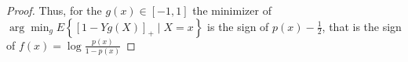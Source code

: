 \begin{proof}
	Thus, for the $g(x)\in\left[-1,1\right]$ the minimizer of $\arg\min_{g} E\left\{\left[1-Yg(X)\right]_{+}\mid X=x\right\}$ is the sign of $p(x)-\frac{1}{2}$, that is the sign of $f(x)=\log\frac{p(x)}{1-p(x)}$
\end{proof}
